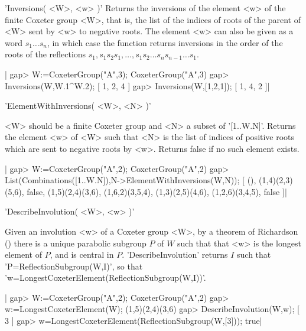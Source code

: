 
'Inversions( <W>, <w> )'
Returns  the inversions of the element <w> of the finite Coxeter group <W>,
that  is, the list of the indices of roots of the parent of <W> sent by <w>
to  negative roots. The element <w> can  also be given as a word $s_1\ldots
s_n$,  in which case  the function returns  inversions in the  order of the
roots  of  the  reflections  $s_1,  s_1  s_2  s_1,\ldots,s_1  s_2\ldots s_n
s_{n-1}\ldots s_1$.

|    gap> W:=CoxeterGroup("A",3);
    CoxeterGroup("A",3)
    gap> Inversions(W,W.1^W.2);
    [ 1, 2, 4 ]
    gap> Inversions(W,[1,2,1]);
    [ 1, 4, 2 ]|



'ElementWithInversions( <W>, <N> )'

<W>  should  be  a  finite  Coxeter  group  and <N> a subset of '[1..W.N]'.
Returns  the element  <w> of  <W> such  that <N>  is the  list of indices of
positive roots which are sent to negative roots by <w>. Returns false if no
such element exists.

|    gap> W:=CoxeterGroup("A",2);
    CoxeterGroup("A",2)
    gap> List(Combinations([1..W.N]),N->ElementWithInversions(W,N));
    [ (), (1,4)(2,3)(5,6), false, (1,5)(2,4)(3,6), (1,6,2)(3,5,4),
      (1,3)(2,5)(4,6), (1,2,6)(3,4,5), false ]|


'DescribeInvolution( <W>, <w> )'

Given  an involution <w> of a Coxeter group <W>, by a theorem of Richardson
(\cite{rich82})  there is a unique parabolic  subgroup $P$ of $W$ such that
that   <w>  is  the  longest  element  of  $P$,  and  is  central  in  $P$.
'DescribeInvolution'  returns $I$ such that 'P=ReflectionSubgroup(W,I)', so
that 'w=LongestCoxeterElement(ReflectionSubgroup(W,I))'.

|    gap> W:=CoxeterGroup("A",2);
    CoxeterGroup("A",2)
    gap> w:=LongestCoxeterElement(W);
    (1,5)(2,4)(3,6)
    gap> DescribeInvolution(W,w);
    [ 3 ]
    gap> w=LongestCoxeterElement(ReflectionSubgroup(W,[3]));
    true|


